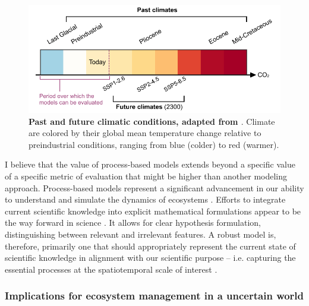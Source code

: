\begin{figure}[h]
\centering
\includegraphics{discussion/figs/tierneyetal2020.pdf}
\caption{\textbf{Past and future climatic conditions, adapted from \citet{Tierney2020}}. Climate are colored by their global mean temperature change relative to preindustrial conditions, ranging from blue (colder) to red (warmer).}
\label{fig:analog}
\end{figure}

I believe that the value of process-based models extends beyond a specific value of a specific metric of evaluation that might be higher than another modeling approach. Process-based models represent a significant advancement in our ability to understand and simulate the dynamics of ecosystems \citep{Pilowsky2022}. Efforts to integrate current scientific knowledge into explicit mathematical formulations appear to be the way forward in science \citep{Evans2012}. It allows for clear hypothesis formulation, distinguishing between relevant and irrelevant features. A robust model is, therefore, primarily one that should appropriately represent the current state of scientific knowledge in alignment with our scientific purpose -- i.e. capturing the essential processes at the spatiotemporal scale of interest \citep{Gramelsberger2020}.

\subsubsection{Implications for ecosystem management in a uncertain world}

